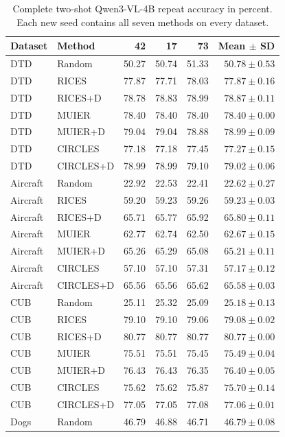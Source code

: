 \documentclass[10pt,twocolumn,letterpaper]{article}
\begin{document}
\begin{table}[t]
\caption{Complete two-shot Qwen3-VL-4B repeat accuracy in percent. Each new seed contains all seven methods on every dataset.}
\label{sup:repeat_accuracy_2}
\centering\small
\begin{tabular}{llrrrr}
\toprule
Dataset & Method & 42 & 17 & 73 & Mean $\pm$ SD \\
\midrule
DTD & Random & 50.27 & 50.74 & 51.33 & $50.78 \pm 0.53$ \\
DTD & RICES & 77.87 & 77.71 & 78.03 & $77.87 \pm 0.16$ \\
DTD & RICES+D & 78.78 & 78.83 & 78.99 & $78.87 \pm 0.11$ \\
DTD & MUIER & 78.40 & 78.40 & 78.40 & $78.40 \pm 0.00$ \\
DTD & MUIER+D & 79.04 & 79.04 & 78.88 & $78.99 \pm 0.09$ \\
DTD & CIRCLES & 77.18 & 77.18 & 77.45 & $77.27 \pm 0.15$ \\
DTD & CIRCLES+D & 78.99 & 78.99 & 79.10 & $79.02 \pm 0.06$ \\
Aircraft & Random & 22.92 & 22.53 & 22.41 & $22.62 \pm 0.27$ \\
Aircraft & RICES & 59.20 & 59.23 & 59.26 & $59.23 \pm 0.03$ \\
Aircraft & RICES+D & 65.71 & 65.77 & 65.92 & $65.80 \pm 0.11$ \\
Aircraft & MUIER & 62.77 & 62.74 & 62.50 & $62.67 \pm 0.15$ \\
Aircraft & MUIER+D & 65.26 & 65.29 & 65.08 & $65.21 \pm 0.11$ \\
Aircraft & CIRCLES & 57.10 & 57.10 & 57.31 & $57.17 \pm 0.12$ \\
Aircraft & CIRCLES+D & 65.56 & 65.56 & 65.62 & $65.58 \pm 0.03$ \\
CUB & Random & 25.11 & 25.32 & 25.09 & $25.18 \pm 0.13$ \\
CUB & RICES & 79.10 & 79.10 & 79.06 & $79.08 \pm 0.02$ \\
CUB & RICES+D & 80.77 & 80.77 & 80.77 & $80.77 \pm 0.00$ \\
CUB & MUIER & 75.51 & 75.51 & 75.45 & $75.49 \pm 0.04$ \\
CUB & MUIER+D & 76.43 & 76.43 & 76.35 & $76.40 \pm 0.05$ \\
CUB & CIRCLES & 75.62 & 75.62 & 75.87 & $75.70 \pm 0.14$ \\
CUB & CIRCLES+D & 77.05 & 77.05 & 77.08 & $77.06 \pm 0.01$ \\
Dogs & Random & 46.79 & 46.88 & 46.71 & $46.79 \pm 0.08$ \\

\end{tabular}
\end{table}
\end{document}
